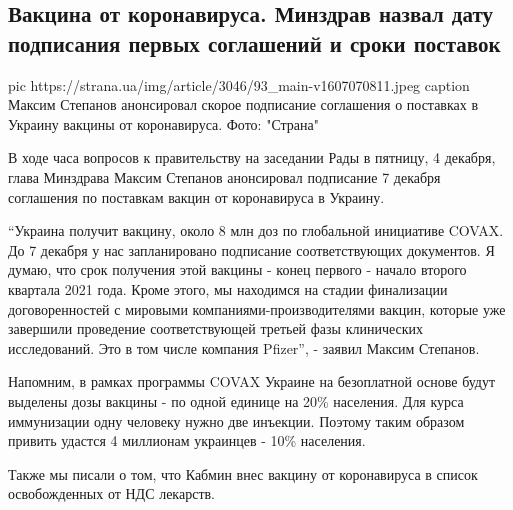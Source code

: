 
 
 
 
 
 
\subsection{Вакцина от коронавируса. Минздрав назвал дату подписания первых соглашений и сроки поставок}
\label{sec:04_12_2020.news.ua.strana.1.vaccine_ukraine_postavki_stepanov}


\ifcmt
pic https://strana.ua/img/article/3046/93_main-v1607070811.jpeg
caption Максим Степанов анонсировал скорое подписание соглашения о поставках в Украину вакцины от коронавируса. Фото: "Страна"
\fi

В ходе часа вопросов к правительству на заседании Рады в пятницу, 4 декабря,
глава Минздрава Максим Степанов анонсировал подписание 7 декабря соглашения по
поставкам вакцин от коронавируса в Украину. 

\enquote{Украина получит вакцину, около 8 млн доз по глобальной инициативе COVAX. До 7
декабря у нас запланировано подписание соответствующих документов. Я думаю, что
срок получения этой вакцины - конец первого - начало второго квартала 2021
года. Кроме этого, мы находимся на стадии финализации договоренностей с
мировыми компаниями-производителями вакцин, которые уже завершили проведение
соответствующей третьей фазы клинических исследований. Это в том числе компания
Pfizer}, - заявил Максим Степанов. 

Напомним, в рамках программы COVAX Украине на безоплатной основе будут выделены
дозы вакцины - по одной единице на 20\% населения. Для курса иммунизации одну
человеку нужно две инъекции. Поэтому таким образом привить удастся 4 миллионам
украинцев - 10\% населения.

Также мы писали о том, что Кабмин внес вакцину от коронавируса в список
освобожденных от НДС лекарств.

